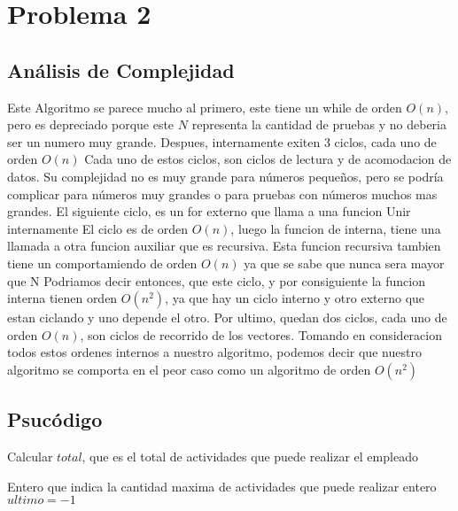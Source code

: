 \documentclass[a4paper,10pt]{article}
\begin{document}
\section{Problema 2}
\subsection{Análisis de Complejidad}
\hspace{2cm}Este Algoritmo se parece mucho al primero, este tiene
un while de orden {$O(n)$}, pero es depreciado porque este {$N$}
representa la cantidad de pruebas y no deberia ser un numero muy 
grande.
Despues, internamente exiten 3 ciclos, cada uno de orden {$O(n)$}
Cada uno de estos ciclos, son ciclos de lectura y de acomodacion de datos.
Su complejidad no es muy grande para números pequeños, pero se podría complicar
para números muy grandes o para pruebas con números muchos mas grandes.
El siguiente ciclo, es un for externo que llama a una funcion Unir internamente 
El ciclo es de orden {$O(n)$}, luego la funcion de interna, tiene una llamada a otra
funcion auxiliar que es recursiva. Esta funcion recursiva tambien tiene un comportamiendo de orden {$O(n)$}
ya que se sabe que nunca sera mayor que N Podriamos decir entonces, que este ciclo, 
y por consiguiente la funcion interna tienen orden {$O(n^{2})$}, ya que hay un ciclo interno 
y otro externo que estan ciclando y uno depende el otro.
Por ultimo, quedan dos ciclos, cada uno de orden {$O(n)$}, son ciclos de recorrido de los vectores. 
Tomando en consideracion todos estos ordenes internos a nuestro algoritmo, podemos decir 
que nuestro algoritmo se comporta en el peor caso como un algoritmo de orden {$O(n^{2})$}
\subsection{Psucódigo}
\begin{algorithm}                      %
\caption{Calcular $total$, que es el total de actividades que puede realizar el empleado}          %
\label{Problema 2}                           %
\begin{algorithmic}[1]                    %
    \ENSURE Entero que indica la cantidad maxima de actividades que puede realizar
    \STATE entero {$ultimo = -1$}
\end{algorithmic}
\end{algorithm}
\end{document}
